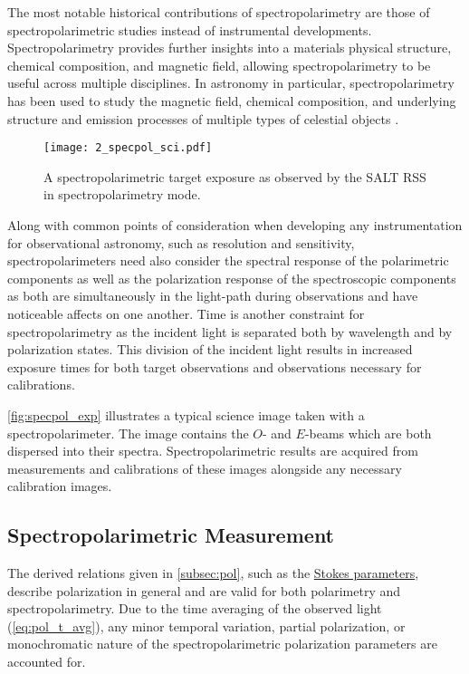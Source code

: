 The most notable historical contributions of spectropolarimetry are those of spectropolarimetric studies instead of instrumental developments.
Spectropolarimetry provides further insights into a materials physical structure, chemical composition, and magnetic field, allowing spectropolarimetry to be useful across multiple disciplines.
In astronomy in particular, spectropolarimetry has been used to study the magnetic field, chemical composition, and underlying structure and emission processes of multiple types of celestial objects \citep[see for example][]{specpol_AGN, specpol_stars, specpol_SN}.

\begin{figure}[t]
    \centering
    \texttt{[image: 2\_specpol\_sci.pdf]}
    \caption{A spectropolarimetric target exposure as observed by the \gls{SALT} \gls{RSS} in spectropolarimetry mode.}
    \label{fig:specpol_exp}
\end{figure}

Along with common points of consideration when developing any instrumentation for observational astronomy, such as resolution and sensitivity, spectropolarimeters need also consider the spectral response of the polarimetric components as well as the polarization response of the spectroscopic components as both are simultaneously in the light-path during observations and have noticeable affects on one another.
Time is another constraint for spectropolarimetry as the incident light is separated both by wavelength and by polarization states.
This division of the incident light results in increased exposure times for both target observations and observations necessary for calibrations.

\autoref{fig:specpol_exp} illustrates a typical science image taken with a spectropolarimeter.
The image contains the $O$- and $E$-beams which are both dispersed into their spectra.
Spectropolarimetric results are acquired from measurements and calibrations of these images alongside any necessary calibration images.

\subsection{Spectropolarimetric Measurement}

The derived relations given in \autoref{subsec:pol}, such as the \hyperref[eq:Stokes_params]{Stokes parameters}, describe polarization in general and are valid for both polarimetry and spectropolarimetry.
Due to the time averaging of the observed light (\autoref{eq:pol_t_avg}), any minor temporal variation, partial polarization, or monochromatic nature of the spectropolarimetric polarization parameters are accounted for.

